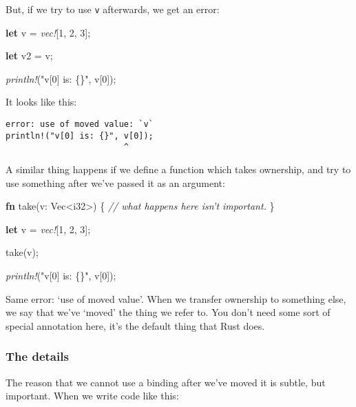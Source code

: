 \documentclass[a4paper,]{book}
\newenvironment{Shaded}{\begin{snugshade}}{\end{snugshade}}
\newcommand{\KeywordTok}[1]{\textcolor[rgb]{0.13,0.29,0.53}{\textbf{{#1}}}}
\newcommand{\DataTypeTok}[1]{\textcolor[rgb]{0.13,0.29,0.53}{{#1}}}
\newcommand{\DecValTok}[1]{\textcolor[rgb]{0.00,0.00,0.81}{{#1}}}
\newcommand{\StringTok}[1]{\textcolor[rgb]{0.31,0.60,0.02}{{#1}}}
\newcommand{\CommentTok}[1]{\textcolor[rgb]{0.56,0.35,0.01}{\textit{{#1}}}}
\newcommand{\PreprocessorTok}[1]{\textcolor[rgb]{0.56,0.35,0.01}{\textit{{#1}}}}
\newcommand{\NormalTok}[1]{{#1}}
\begin{document}
But, if we try to use \texttt{v} afterwards, we get an error:

\begin{Shaded}
\begin{Highlighting}[]
\KeywordTok{let} \NormalTok{v = }\PreprocessorTok{vec!}\NormalTok{[}\DecValTok{1}\NormalTok{, }\DecValTok{2}\NormalTok{, }\DecValTok{3}\NormalTok{];}

\KeywordTok{let} \NormalTok{v2 = v;}

\PreprocessorTok{println!}\NormalTok{(}\StringTok{"v[0] is: \{\}"}\NormalTok{, v[}\DecValTok{0}\NormalTok{]);}
\end{Highlighting}
\end{Shaded}

It looks like this:

\begin{verbatim}
error: use of moved value: `v`
println!("v[0] is: {}", v[0]);
                        ^
\end{verbatim}

A similar thing happens if we define a function which takes ownership,
and try to use something after we've passed it as an argument:

\begin{Shaded}
\begin{Highlighting}[]
\KeywordTok{fn} \NormalTok{take(v: }\DataTypeTok{Vec}\NormalTok{<}\DataTypeTok{i32}\NormalTok{>) \{}
    \CommentTok{// what happens here isn’t important.}
\NormalTok{\}}

\KeywordTok{let} \NormalTok{v = }\PreprocessorTok{vec!}\NormalTok{[}\DecValTok{1}\NormalTok{, }\DecValTok{2}\NormalTok{, }\DecValTok{3}\NormalTok{];}

\NormalTok{take(v);}

\PreprocessorTok{println!}\NormalTok{(}\StringTok{"v[0] is: \{\}"}\NormalTok{, v[}\DecValTok{0}\NormalTok{]);}
\end{Highlighting}
\end{Shaded}

Same error: `use of moved value'. When we transfer ownership to
something else, we say that we've `moved' the thing we refer to. You
don't need some sort of special annotation here, it's the default thing
that Rust does.

\subsubsection{The details}\label{the-details}

The reason that we cannot use a binding after we've moved it is subtle,
but important. When we write code like this:
\end{document}
